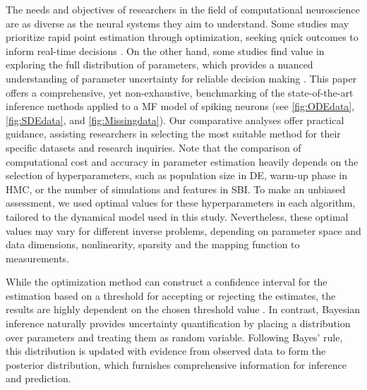 \documentclass[preprint,11pt,authoryear]{elsarticle}
\begin{document}
The needs and objectives of researchers in the field of computational neuroscience are as diverse as the neural systems they aim to understand. Some studies may prioritize rapid point estimation through optimization, seeking quick outcomes to inform real-time decisions \citep{Vattikonda2021, Penas2023}. On the other hand, some studies find value in exploring the full distribution of parameters, which provides a nuanced understanding of parameter uncertainty for reliable decision making \citep{Hashemi2020, Jha2022}. This paper offers a comprehensive, yet non-exhaustive, benchmarking of the state-of-the-art inference methods applied to a MF model of spiking neurons (see \autoref{fig:ODEdata}, \autoref{fig:SDEdata}, and \autoref{fig:Missingdata}). Our comparative analyses offer practical guidance, assisting researchers in selecting the most suitable method for their specific datasets and research inquiries. Note that the comparison of computational cost and accuracy in parameter estimation heavily depends on the selection of hyperparameters, such as population size in DE, warm-up phase in HMC, or the number of simulations and features in SBI. To make an unbiased assessment, we used optimal values for these hyperparameters in each algorithm, tailored to the dynamical model used in this study. Nevertheless, these optimal values may vary for different inverse problems, depending on parameter space and data dimensions, nonlinearity, sparsity and the mapping function to measurements.

While the optimization method can construct a confidence interval for the estimation based on a threshold for accepting or rejecting the estimates, the results are highly dependent on the chosen threshold value \citep{Beaumont2002, Cranmer2020}. In contrast, Bayesian inference naturally provides uncertainty quantification by placing a distribution over parameters and treating them as random variable. Following Bayes' rule, this distribution is updated with evidence from observed data to form the posterior distribution, which furnishes comprehensive information for inference and prediction. 
\end{document}

